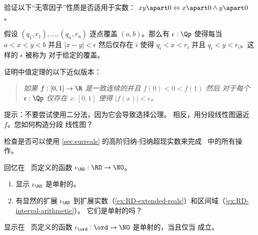 \begin{ex} \label{ex:reals-apart-zero-divisors}
%
验证以下“无零因子”性质是否适用于实数：
$x y \apart 0 \Leftrightarrow x \apart 0 \land y \apart 0$。
\end{ex}

\begin{ex} \label{ex:finite-cover-lebesgue-number}
%
假设 $(q_1, r_1), \ldots, (q_n, r_n)$ 逐点覆盖 $(a, b)$。那么有
$\epsilon : \Qp$ 使得每当 $a < x < y < b$ 并且 $|x - y| < \epsilon$
然后仅存在 $i$ 使得 $q_i < x < r_i$ 并且 $q_i < y < r_i$。这样的
$\epsilon$ 被称为
%
对于给定的覆盖。
\end{ex}

\begin{ex} \label{ex:mean-value-theorem}
%
证明中值定理的以下近似版本：
%
\begin{quote}
  \emph{
    如果 $f : [0,1] \to \R$ 是一致连续的并且 $f(0) < 0 < f(1)$ 然后
    对于每个 $\epsilon : \Qp$ 仅存在 $x : [0,1]$ 使得 $|f(x)| <
    \epsilon$。
  }
\end{quote}
%
提示：不要尝试使用二分法，因为它会导致选择公理。
相反，用分段线性图逼近 $f$。您如何构造分段
线性图？
\end{ex}

\begin{ex}\label{ex:knuth-surreal-check}
检查是否可以使用 \cref{sec:surreals} 的高阶归纳-归纳超现实数来完成~\cite{knuth74:_surreal_number} 中的所有操作。
\end{ex}

\begin{ex}\label{ex:reals-into-surreals}
回忆在~\pageref{reals-into-surreals} 页定义的函数 $\iota_{\RD}:\RD\to\NO$。
\begin{enumerate}
  \item 显示 $\iota_{\RD}$ 是单射的。
  \item 有显然的扩展 $\iota_{\RD}$ 到扩展实数（\cref{ex:RD-extended-reals}）和区间域（\cref{ex:RD-interval-arithmetic}）。
  它们是单射的吗？
\end{enumerate}
\end{ex}

\begin{ex}\label{ex:ord-into-surreals}
显示在~\pageref{ord-into-surreals} 页定义的函数 $\iota_{\ord}:\ord\to\NO$ 是单射的，当且仅当 \LEM{} 成立。
\end{ex}

